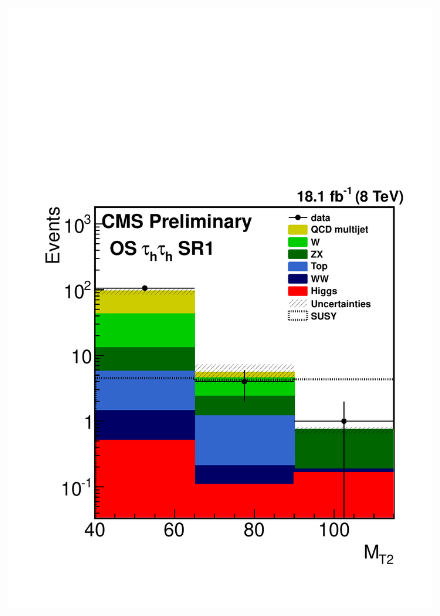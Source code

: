 \begin{figure}[!htb]
\centering
\includegraphics[angle=0,scale=0.375]{TauTauFigs/MT2.pdf}

\end{figure}
